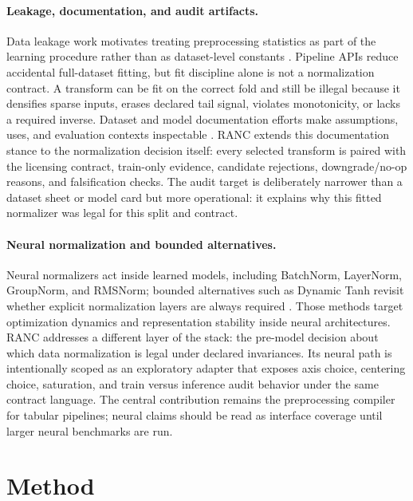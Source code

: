 \documentclass{article}
\begin{document}
\paragraph{Leakage, documentation, and audit artifacts.}
Data leakage work motivates treating preprocessing statistics as part of the
learning procedure rather than as dataset-level constants
\cite{kaufman2012leakage}. Pipeline APIs reduce accidental full-dataset fitting,
but fit discipline alone is not a normalization contract. A transform can be fit
on the correct fold and still be illegal because it densifies sparse inputs,
erases declared tail signal, violates monotonicity, or lacks a required inverse.
Dataset and model documentation efforts make assumptions, uses, and evaluation
contexts inspectable \cite{gebru2021datasheets,mitchell2019modelcards}. RANC
extends this documentation stance to the normalization decision itself: every
selected transform is paired with the licensing contract, train-only evidence,
candidate rejections, downgrade/no-op reasons, and falsification checks. The
audit target is deliberately narrower than a dataset sheet or model card but
more operational: it explains why this fitted normalizer was legal for this
split and contract.

\paragraph{Neural normalization and bounded alternatives.}
Neural normalizers act inside learned models, including BatchNorm, LayerNorm,
\mbox{GroupNorm}, and \mbox{RMSNorm}; bounded alternatives such as Dynamic Tanh
revisit whether explicit normalization layers are always required
\cite{ioffe2015batch,ba2016layer,wu2018group,zhang2019rmsnorm,zhu2025dyt}.
Those methods target optimization dynamics and representation stability inside
neural architectures. RANC addresses a different layer of the stack: the
pre-model decision about which data normalization is legal under declared
invariances. Its neural path is intentionally scoped as an exploratory adapter
that exposes axis choice, centering choice, saturation, and train versus
inference audit behavior under the same contract language. The central
contribution remains the preprocessing compiler for tabular pipelines; neural
claims should be read as interface coverage until larger neural benchmarks are
run.

\section{Method}
\end{document}
